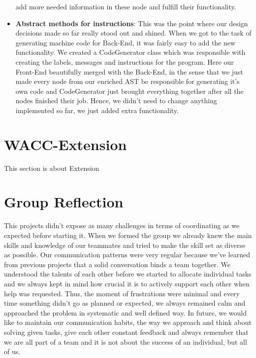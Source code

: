 \documentclass[11pt]{article}
\begin{document}
\begin{itemize}[noitemsep,topsep=0pt]
    add more needed information in these node and fulfill their functionality.
  \item \textbf{Abstract methods for instructions}:
    This was the point where our design decisions made so far really stood out
     and shined. When we got to the task of generating machine code for Back-End,
     it was fairly easy to add the new functionality. We created a CodeGenerator
      class which was responsible with creating the labels, messages and instructions
      for the program. Here our Front-End beautifully merged with the Back-End,
      in the sense that we just made every node from our enriched AST be responsible
      for generating it's own code and CodeGenerator just brought everything together
      after all the nodes finished their job. Hence, we didn't need to change anything
      implemented so far, we just added extra functionality.
\end{itemize}

\section{WACC-Extension}
\iffalse
BEYOND THE SPECIFICATION(4/4)
1. An evaluation of your extensions to your WACC compiler
2. Describe all of the language extensions, optimisations or other aspects that
you have added to your compiler, including how these features can be accessed or viewed
3. BRIEFLY discuss what future extensions you would like to add to your WACC
compiler if you had more time
\fi
This section is about Extension

\section{Group Reflection}

\iffalse
THE PROJECT MANAGEMENT(2/4):
1. Analysis of the organisation of your group
2. Use of project management tools (such as Git)
3. How your group was structured
4. How you coordinated your work and detail any tools that helped/hindered your progress
5. What went well and what you would do differently if you were to do the lab again
\fi

This projects didn't expose as many challenges in terms of coordinating as we
expected before starting it. When we formed the group we already knew the main skills
and knowledge of our teammates and tried to make the skill set as diverse as possible.
Our communication patterns were very regular because we've learned from previous
projects that a solid conversation binds a team together. We understood the talents
of each other before we started to allocate individual tasks  and we always kept
in mind how crucial it is to actively support each other when help was requested.
Thus, the moment of frustrations were minimal and every time something didn't go
as planned or expected, we always remained calm and approached the problem in
systematic and well defined way. In future, we would like to maintain our communication
habits, the way we approach and think about solving given tasks, give each other
constant feedback and always remember that we are all part of a team and it is not
about the success of an individual, but all of us.
\end{document}
